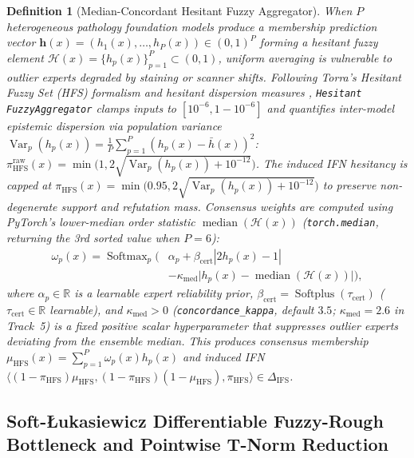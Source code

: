 \documentclass[10pt,twocolumn]{article}
\newtheorem{definition}{Definition}
\begin{document}
\begin{definition}[Median-Concordant Hesitant Fuzzy Aggregator]
\label{def:hfs}
When $P$ heterogeneous pathology foundation models produce a membership prediction vector
$\bm{h}(x) = (h_1(x),\dots,h_P(x)) \in (0,1)^P$ forming a hesitant fuzzy element
$\mathcal{H}(x) = \{h_p(x)\}_{p=1}^P \subset (0,1)$, uniform averaging is vulnerable to outlier
experts degraded by staining or scanner shifts. Following Torra's Hesitant Fuzzy Set (HFS)
formalism and hesitant dispersion measures
\cite{torra2010hesitant,xia2012entropy,liao2013vikor}, \texttt{Hesitant\allowbreak
Fuzzy\allowbreak Aggregator} clamps inputs to $[10^{-6}, 1-10^{-6}]$ and quantifies inter-model
epistemic dispersion via population variance $\operatorname{Var}_p(h_p(x)) =
\frac{1}{P}\sum_{p=1}^P (h_p(x) - \bar{h}(x))^2$: $\pi_{\text{HFS}}^{\text{raw}}(x) =
\min\!\big(1, 2\sqrt{\operatorname{Var}_p(h_p(x)) + 10^{-12}}\big)$. The induced IFN hesitancy
is capped at $\pi_{\text{HFS}}(x) = \min\!\big(0.95, 2\sqrt{\operatorname{Var}_p(h_p(x)) +
10^{-12}}\big)$ to preserve non-degenerate support and refutation mass. Consensus weights are
computed using PyTorch's lower-median order statistic $\operatorname{median}(\mathcal{H}(x))$
(\texttt{torch.median}, returning the 3rd sorted value when $P=6$):
\begin{equation}
\label{eq:hfs_weights}
\begin{aligned}
\omega_p(x) = \operatorname{Softmax}_p\Big(&\alpha_p + \beta_{\text{cert}} |2h_p(x)-1| \\
&- \kappa_{\text{med}} \big|h_p(x) - \operatorname{median}(\mathcal{H}(x))\big|\Big),
\end{aligned}
\end{equation}
where $\alpha_p \in \mathbb{R}$ is a learnable expert reliability prior, $\beta_{\text{cert}} =
\operatorname{Softplus}(\tau_{\text{cert}})$ ($\tau_{\text{cert}} \in \mathbb{R}$ learnable),
and $\kappa_{\text{med}} > 0$ (\texttt{concordance\_kappa}, default $3.5$; $\kappa_{\text{med}}
= 2.6$ in Track~5) is a fixed positive scalar hyperparameter that suppresses outlier experts
deviating from the ensemble median. This produces consensus membership $\mu_{\text{HFS}}(x) =
\sum_{p=1}^P \omega_p(x) h_p(x)$ and induced IFN $\langle (1-\pi_{\text{HFS}})\mu_{\text{HFS}},
(1-\pi_{\text{HFS}})(1-\mu_{\text{HFS}}), \pi_{\text{HFS}}\rangle \in \Delta_{\text{IFS}}$.
\end{definition}

\subsection{Soft-\texorpdfstring{{\L}}{L}ukasiewicz Differentiable Fuzzy-Rough Bottleneck and
Pointwise T-Norm Reduction}
\end{document}
